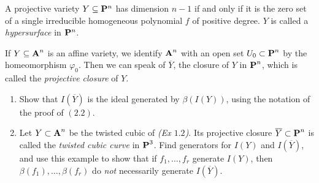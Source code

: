 \documentclass[10pt]{amsart}
\begin{document}
\begin{solution}
    
\end{solution}

\begin{exercise}[2.8]
    A projective variety $Y \subseteq \bbP^n$ has dimension $n-1$ if
    and only if it is the zero set of a single irreducible homogeneous polynomial
    $f$ of positive degree. $Y$ is called a \emph{hypersurface} in $\bbP^n$.   
\end{exercise}

\begin{solution}
    
\end{solution}

\begin{exercise}[2.9]
    If $Y \subseteq \aa^n$ is an affine variety, we identify $\aa^n$ with an open
    set $U_0 \subset \pp^n$ by the homeomorphism $\varphi_0$. Then we can speak of
    $\overline{Y}$, the closure of $Y$ in $\pp^n$, which is called the
    \emph{projective closure} of $Y$. 
   \begin{enumerate}
     \item Show that $I(\overline{Y})$ is the ideal generated by $\beta(I(Y))$,
       using the notation of the proof of $(2.2)$. 
     \item Let $Y \subset \aa^n$ be the twisted cubic of \emph{(Ex $1.2$)}. Its
       projective closure $\overline{Y} \subset \pp^n$ is called the \emph{twisted
       cubic curve} in $\pp^3$. Find generators for $I(Y)$ and $I(\overline{Y})$,
       and use this example to show that if $f_1, \ldots, f_r$ generate $I(Y)$,
       then $\beta(f_1), \ldots, \beta(f_r)$ do \emph{not} necessarily generate
       $I(\overline{Y})$. 
   \end{enumerate}
\end{exercise}
\end{document}
